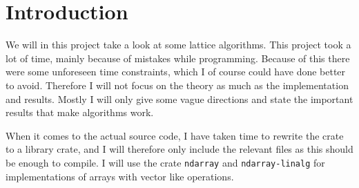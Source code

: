 \section{Introduction}

  We will in this project take a look at some lattice algorithms.
  This project took a lot of time, mainly because of mistakes while programming.
  Because of this there were some unforeseen time constraints, which I of course could have done better to avoid.
  Therefore I will not focus on the theory as much as the implementation and results.
  Mostly I will only give some vague directions and state the important results that make algorithms work.
  
  When it comes to the actual source code, I have taken time to rewrite the crate to a library crate, and I will therefore only include the relevant files as this should be enough to compile.
  I will use the crate \texttt{ndarray} and \texttt{ndarray-linalg} for implementations of arrays with vector like operations.
